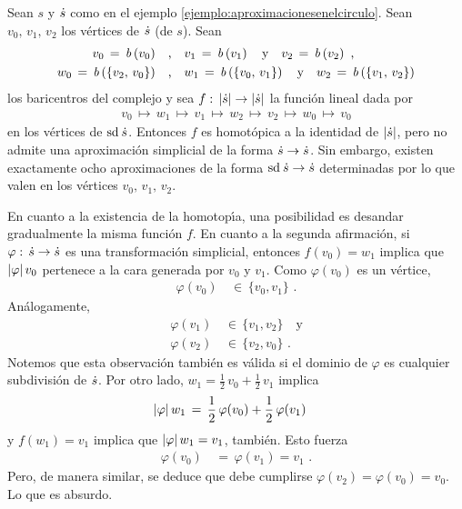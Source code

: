 \begin{ejemploAproximacionesEnElCirculoCont}%
	\label{ejemplo:aproximacionesenelcirculocont}
	Sean $s$ y $\dot{s}$ como en el ejemplo
	\ref{ejemplo:aproximacionesenelcirculo}. Sean $v_{0},\,v_{1},\,v_{2}$
	los v\'{e}rtices de $\dot{s}$ (de $s$). Sean
	\begin{align*}
		v_{0} \,=\,\mathit{b}\left(v_{0}\right) & \quad\text{,}\quad
		v_{1} \,=\,\mathit{b}\left(v_{1}\right) \quad\text{y}\quad
		v_{2} \,=\,\mathit{b}\left(v_{2}\right) \text{ ,} \\
		w_{0} \,=\,\mathit{b}\left(\{v_{2},\,v_{0}\}\right) & \quad\text{,}\quad
		w_{1} \,=\,\mathit{b}\left(\{v_{0},\,v_{1}\}\right) \quad\text{y}\quad
		w_{2} \,=\,\mathit{b}\left(\{v_{1},\,v_{2}\}\right)
	\end{align*}
	los baricentros del complejo y sea
	$f:\,\left|\dot{s}\right|\rightarrow\left|\dot{s}\right|$ la funci\'{o}n
	lineal dada por
	\begin{align*}
		v_{0}\,\mapsto\,w_{1}\,\mapsto\,v_{1}\,\mapsto\,w_{2}
			\,\mapsto\,v_{2}\,\mapsto\,w_{0}\,\mapsto\,v_{0}
	\end{align*}
	en los v\'{e}rtices de $\mathrm{sd}^{}\,\dot{s}$. Entonces $f$ es
	homot\'{o}pica a la identidad de $\left|\dot{s}\right|$, pero
	no admite una aproximaci\'{o}n simplicial de la forma
	$\dot{s}\rightarrow\dot{s}$. Sin embargo, existen exactamente
	ocho aproximaciones de la forma
	$\mathrm{sd}^{}\,\dot{s}\rightarrow\dot{s}$ determinadas por lo que
	valen en los v\'{e}rtices $v_{0},\,v_{1},\,v_{2}$.

	En cuanto a la existencia de la homotop\'{\i}a, una posibilidad es
	desandar gradualmente la misma funci\'{o}n $f$. En cuanto a la
	segunda afirmaci\'{o}n, si $\varphi:\,\dot{s}\rightarrow\dot{s}$
	es una transformaci\'{o}n simplicial, entonces
	$f(v_{0})=w_{1}$ implica que $\left|\varphi\right|v_{0}$ pertenece
	a la cara generada por $v_{0}$ y $v_{1}$. Como $\varphi(v_{0})$ es
	un v\'{e}rtice,
	\begin{align*}
		\varphi(v_{0}) & \,\in\,\{v_{0},v_{1}\}
		\text{ .}
	\end{align*}
	An\'{a}logamente,
	\begin{align*}
		\varphi(v_{1}) & \,\in\,\{v_{1},v_{2}\}\quad\text{y} \\
		\varphi(v_{2}) & \,\in\,\{v_{2},v_{0}\}
		\text{ .}
	\end{align*}
	Notemos que esta observaci\'{o}n tambi\'{e}n es v\'{a}lida si el
	dominio de $\varphi$ es cualquier subdivisi\'{o}n de $\dot{s}$.
	Por otro lado, $w_{1}=\frac{1}{2}\,v_{0}+\frac{1}{2}\,v_{1}$ implica
	\begin{align*}
		\left|\varphi\right|w_{1}& \,=\,
			\frac{1}{2}\,\varphi(v_{0})
			+ \frac{1}{2}\,\varphi(v_{1})
	\end{align*}
	y $f(w_{1})=v_{1}$ implica que $\left|\varphi\right|w_{1}=v_{1}$,
	tambi\'{e}n. Esto fuerza
	\begin{align*}
		\varphi(v_{0}) & \,=\,\varphi(v_{1})=v_{1}
		\text{ .}
	\end{align*}
	Pero, de manera similar, se deduce que debe cumplirse
	$\varphi(v_{2})=\varphi(v_{0})=v_{0}$. Lo que es absurdo.


\end{ejemploAproximacionesEnElCirculoCont}
